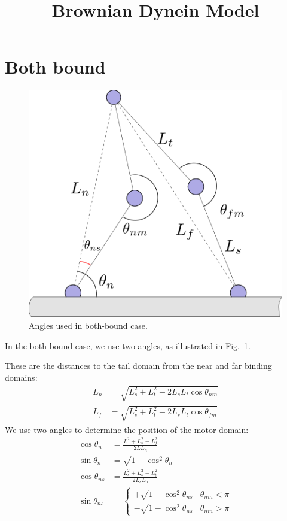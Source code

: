 \documentclass[11pt,twocolumn]{article}
\title{Brownian Dynein Model}
\begin{document}
\maketitle

\section{Both bound}

\begin{figure}
  \includegraphics[width=\columnwidth]{../figures/code-bothbound.png}
  \caption{Angles used in both-bound case.}\label{fig:bothbound}
\end{figure}

In the both-bound case, we use two angles, as illustrated in
Fig.~\ref{fig:bothbound}.

These are the distances to the tail domain from the near and far
binding domains:
\begin{align}
  L_n &= \sqrt{L_s^2 + L_t^2 - 2L_sL_t\cos{\theta_{nm}}} \\
  L_f &= \sqrt{L_s^2 + L_t^2 - 2L_sL_t\cos{\theta_{fm}}}
\end{align}
We use two angles to determine the position of the motor domain:
\begin{align}
  \cos\theta_n &= \frac{L^2 + L_n^2 - L_f^2}{2L L_n} \\
  \sin\theta_{n} &= \sqrt{1 - \cos^2\theta_{n}} \\
  \cos\theta_{ns} &= \frac{L_s^2 + L_n^2 - L_t^2}{2L_s L_n} \\
  \sin\theta_{ns} &=
  \begin{cases}
    +\sqrt{1 - \cos^2\theta_{ns}} & \theta_{nm} < \pi \\
    -\sqrt{1 - \cos^2\theta_{ns}} & \theta_{nm} > \pi
  \end{cases}
\end{align}
\end{document}
